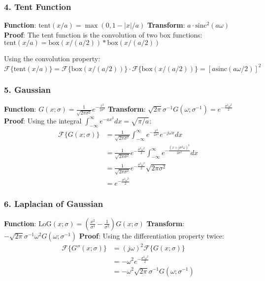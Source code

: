 \documentclass[12pt,a4paper]{article}
\begin{document}
\subsubsection*{4. Tent Function}
\textbf{Function}: $\text{tent}(x/a) = \max(0, 1 - |x|/a)$
\newline
\textbf{Transform}: $a \cdot \text{sinc}^2(a\omega)$
\newline
\textbf{Proof}: The tent function is the convolution of two box functions:
$\text{tent}(x/a) = \text{box}(x/(a/2)) * \text{box}(x/(a/2))$

Using the convolution property:
\begin{equation*}
\mathcal{F}\{\text{tent}(x/a)\} = \mathcal{F}\{\text{box}(x/(a/2))\} \cdot \mathcal{F}\{\text{box}(x/(a/2))\} = [a\text{sinc}(a\omega/2)]^2
\end{equation*}

\subsubsection*{5. Gaussian}
\textbf{Function}: $G(x; \sigma) = \frac{1}{\sqrt{2\pi\sigma^2}} e^{-\frac{x^2}{2\sigma^2}}$
\newline
\textbf{Transform}: $\sqrt{2\pi}\sigma^{-1} G(\omega; \sigma^{-1}) = e^{-\frac{\sigma^2\omega^2}{2}}$
\newline
\textbf{Proof}: Using the integral $\int_{-\infty}^{\infty} e^{-ax^2} dx = \sqrt{\pi/a}$:
\begin{align*}
\mathcal{F}\{G(x; \sigma)\} &= \frac{1}{\sqrt{2\pi\sigma^2}} \int_{-\infty}^{\infty} e^{-\frac{x^2}{2\sigma^2}}e^{-j\omega x}dx\\
&= \frac{1}{\sqrt{2\pi\sigma^2}} e^{-\frac{\sigma^2\omega^2}{2}} \int_{-\infty}^{\infty} e^{-\frac{(x+j\sigma^2\omega)^2}{2\sigma^2}}dx\\
&= \frac{1}{\sqrt{2\pi\sigma^2}} e^{-\frac{\sigma^2\omega^2}{2}} \sqrt{2\pi\sigma^2}\\
&= e^{-\frac{\sigma^2\omega^2}{2}}
\end{align*}

\subsubsection*{6. Laplacian of Gaussian}
\textbf{Function}: $\text{LoG}(x; \sigma) = \left(\frac{x^2}{\sigma^4} - \frac{1}{\sigma^2}\right)G(x; \sigma)$
\newline
\textbf{Transform}: $-\sqrt{2\pi}\sigma^{-1}\omega^2 G(\omega; \sigma^{-1})$
\newline
\textbf{Proof}: Using the differentiation property twice:
\begin{align*}
\mathcal{F}\{G''(x; \sigma)\} &= (j\omega)^2 \mathcal{F}\{G(x; \sigma)\}\\
&= -\omega^2 e^{-\frac{\sigma^2\omega^2}{2}}\\
&= -\omega^2 \sqrt{2\pi}\sigma^{-1} G(\omega; \sigma^{-1})
\end{align*}
\end{document}
